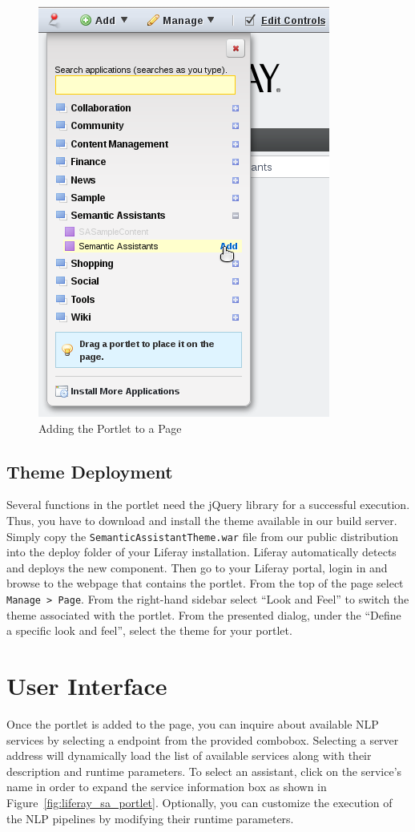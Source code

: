 \begin{figure}
\centering
\includegraphics[scale=0.6]{pictures/liferay_add_portlet.png}
\caption{Adding the \sa Portlet to a Page}
\label{fig:liferay_add_portlet}
\end{figure}

\subsection{Theme Deployment}
\label{sec:theme_deploy}
Several functions in the \sa portlet need the jQuery library for a successful execution. Thus, you have to download and install the \sa theme available in our build server. Simply copy the \texttt{SemanticAssistantTheme.war} file from our public distribution into the deploy folder of your Liferay installation. Liferay automatically detects and deploys the new component. Then go to your Liferay portal, login in and browse to the webpage that contains the \sa portlet. From the top of the page select \texttt{Manage \textgreater~Page}. From the right-hand sidebar select ``Look and Feel'' to switch the theme associated with the \sa portlet. From the presented dialog, under the ``Define a specific look and feel'', select the \sa theme for your portlet.

\section{User Interface}
Once the portlet is added to the page, you can inquire about available NLP services by selecting a \sa endpoint from the provided combobox. Selecting a server address will dynamically load the list of available services along with their description and runtime parameters. To select an assistant, click on the service's name in order to expand the service information box as shown in Figure~\ref{fig:liferay_sa_portlet}. Optionally, you can customize the execution of the NLP pipelines by modifying their runtime parameters.

